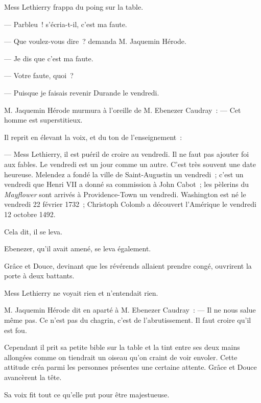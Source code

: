 \documentclass[french,twoside]{book} %
\begin{document}
Mess Lethierry frappa du poing sur la table.\par
— Parbleu ! s’écria-t-il, c’est ma faute.\par
— Que voulez-vous dire ? demanda M. Jaquemin Hérode.\par
— Je dis que c’est ma faute.\par
 — Votre faute, quoi ?\par
— Puisque je faisais revenir Durande le vendredi.\par
M. Jaquemin Hérode murmura à l’oreille de M. Ebenezer Caudray : — Cet homme est superstitieux.\par
Il reprit en élevant la voix, et du ton de l’enseignement :\par
— Mess Lethierry, il est puéril de croire au vendredi. Il ne faut pas ajouter foi aux fables. Le vendredi est un jour comme un autre. C’est très souvent une date heureuse. Melendez a fondé la ville de Saint-Augustin un vendredi ; c’est un vendredi que Henri VII a donné sa commission à John Cabot ; les pèlerins du \emph{Mayflower} sont arrivés à Providence-Town un vendredi. Washington est né le vendredi 22 février 1732 ; Christoph Colomb a découvert l’Amérique le vendredi 12 octobre 1492.\par
Cela dit, il se leva.\par
Ebenezer, qu’il avait amené, se leva également.\par
Grâce et Douce, devinant que les révérends allaient prendre congé, ouvrirent la porte à deux battants.\par
Mess Lethierry ne voyait rien et n’entendait rien.\par
M. Jaquemin Hérode dit en aparté à M. Ebenezer Caudray : — Il ne nous salue même pas. Ce n’est pas du chagrin, c’est de l’abrutissement. Il faut croire qu’il est fou.\par
Cependant il prit sa petite bible sur la table et la tint entre ses deux mains allongées comme on tiendrait un oiseau qu’on craint de voir envoler. Cette attitude créa parmi les personnes présentes une certaine attente. Grâce et Douce avancèrent la tête.\par
 Sa voix fit tout ce qu’elle put pour être majestueuse.\par
\end{document}
